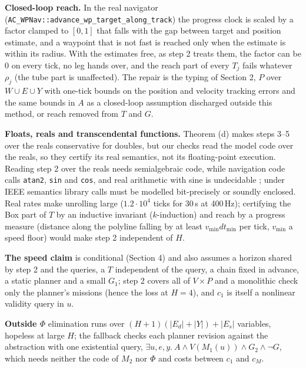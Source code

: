 \documentclass[10pt,a4paper]{article}
\makeatletter
\renewcommand\section{\@startsection{section}{1}{0pt}{0.8ex plus .2ex}{0.4ex}{\normalfont\large\bfseries}}
\newcommand{\lt}[1]{\texttt{#1}}
\makeatother
\begin{document}
\textbf{Closed-loop reach.} In the real navigator (\lt{AC\_WPNav::advance\_wp\_target\_along\_track}) the progress clock is scaled by a factor clamped to $[0,1]$ that falls with the gap between target and position estimate, and a waypoint that is not fast is reached only when the estimate is within its radius. With the estimates free, as step 2 treats them, the factor can be $0$ on every tick, no leg hands over, and the reach part of every $T_j$ fails whatever $\rho_j$ (the tube part is unaffected). The repair is the typing of Section 2, $P$ over $W\cup E\cup Y$ with one-tick bounds on the position and velocity tracking errors and the same bounds in $A$ as a closed-loop assumption discharged outside this method, or reach removed from $T$ and $G$.

\textbf{Floats, reals and transcendental functions.} Theorem (d) makes steps 3--5 over the reals conservative for doubles, but our checks read the model code over the reals, so they certify its real semantics, not its floating-point execution. Reading step 2 over the reals needs semialgebraic code, while navigation code calls \lt{atan2}, \lt{sin} and \lt{cos}, and real arithmetic with sine is undecidable \cite{richardson}; under IEEE semantics library calls must be modelled bit-precisely or soundly enclosed. Real rates make unrolling large ($1.2\cdot10^4$ ticks for 30\,s at 400\,Hz); certifying the Box part of $T$ by an inductive invariant ($k$-induction) and reach by a progress measure (distance along the polyline falling by at least $v_{\min}dt_{\min}$ per tick, $v_{\min}$ a speed floor) would make step 2 independent of $H$.

\textbf{The speed claim} is conditional (Section 4) and also assumes a horizon shared by step 2 and the queries, a $T$ independent of the query, a chain fixed in advance, a static planner and a small $G_1$; step 2 covers all of $V\times P$ and a monolithic check only the planner's missions (hence the loss at $H=4$), and $c_1$ is itself a nonlinear validity query in $u$.

\textbf{Outside $\Phi$} elimination runs over $(H+1)(|E_d|+|Y|)+|E_s|$ variables, hopeless at large $H$; the fallback checks each planner revision against the abstraction with one existential query, $\exists u,e,y.\ A\wedge V(M_1(u))\wedge G_2\wedge\lnot G$, which needs neither the code of $M_2$ nor $\Phi$ and costs between $c_1$ and $c_M$.

\section{Reproduction}
\end{document}
